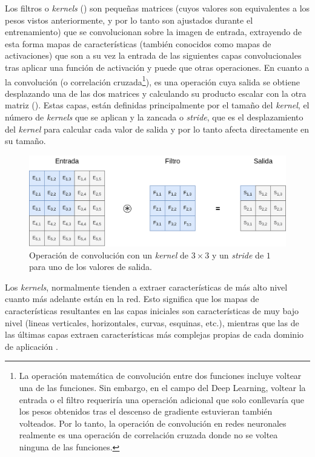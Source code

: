 Los filtros o \textit{kernels} () son pequeñas matrices (cuyos valores son equivalentes a los pesos vistos anteriormente, y por lo tanto son ajustados durante el entrenamiento) que se convolucionan sobre la imagen de entrada, extrayendo de esta forma mapas de características (también conocidos como mapas de activaciones) que son a su vez la entrada de las siguientes capas convolucionales tras aplicar una función de activación y puede que otras operaciones. En cuanto a la convolución (o correlación cruzada\footnote{La operación matemática de convolución entre dos funciones incluye voltear una de las funciones. Sin embargo, en el campo del Deep Learning, voltear la entrada o el filtro requeriría una operación adicional que solo conllevaría que los pesos obtenidos tras el descenso de gradiente estuvieran también volteados. Por lo tanto, la operación de convolución en redes neuronales realmente es una operación de correlación cruzada donde no se voltea ninguna de las funciones.}), es una operación cuya salida se obtiene desplazando una de las dos matrices y calculando su producto escalar con la otra matriz (). Estas capas, están definidas principalmente por el tamaño del \textit{kernel}, el número de \textit{kernels} que se aplican y la zancada o \textit{stride}, que es el desplazamiento del \textit{kernel} para calcular cada valor de salida y por lo tanto afecta directamente en su tamaño. 

\begin{figure}[H]
\centering
\includegraphics[width=0.8\linewidth]{imagenes/convolucion.png} 
\captionsetup{width=.8\linewidth}
\caption{Operación de convolución con un \textit{kernel} de $3\times3$ y un \textit{stride} de $1$ para uno de los valores de salida.}
\label{fig:convolucion}
\end{figure}

Los \textit{kernels}, normalmente tienden a extraer características de más alto nivel cuanto más adelante están en la red. Esto significa que los mapas de características resultantes en las capas iniciales son características de muy bajo nivel (lineas verticales, horizontales, curvas, esquinas, etc.), mientras que las de las últimas capas extraen características más complejas propias de cada dominio de aplicación \cite{zeiler2014visualizing}.

